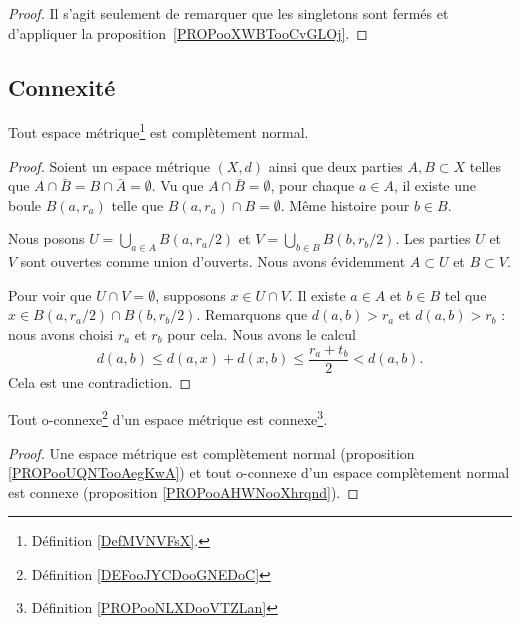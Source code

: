 \begin{proof}
	Il s'agit seulement de remarquer que les singletons sont fermés et d'appliquer la proposition~\ref{PROPooXWBTooCvGLOj}.
\end{proof}

\subsection{Connexité}


\begin{proposition}	\label{PROPooUQNTooAegKwA}
	Tout espace métrique\footnote{Définition \ref{DefMVNVFsX}.} est complètement normal.
\end{proposition}

\begin{proof}
	Soient un espace métrique \( (X,d)\) ainsi que deux parties \( A,B\subset X\) telles que \( A\cap \bar B=B\cap\bar A=\emptyset\). Vu que \( A\cap \bar B=\emptyset\), pour chaque \( a\in A\), il existe une boule \( B(a,r_a)\) telle que \( B(a,r_a)\cap B=\emptyset\). Même histoire pour \( b\in B\).

	Nous posons \( U=\bigcup_{a\in A}B(a,r_a/2)\) et \( V=\bigcup_{b\in B}B(b,r_b/2)\). Les parties \( U\) et \( V\) sont ouvertes comme union d'ouverts. Nous avons évidemment \( A\subset U\) et \( B\subset V\).

	Pour voir que \( U\cap V=\emptyset\), supposons \( x\in U\cap V\). Il existe \( a\in A\) et \( b\in B\) tel que \( x\in B(a,r_a/2)\cap B(b,r_b/2)\). Remarquons que \( d(a,b)>r_a\) et \( d(a,b)>r_b\) : nous avons choisi \( r_a\) et \( r_b\) pour cela. Nous avons le calcul
	\begin{equation}
		d(a,b)  \leq d(a,x)+d(x,b)
		\leq \frac{ r_a+t_b }{2}
		<d(a,b).
	\end{equation}
	Cela est une contradiction.
\end{proof}

\begin{proposition}	\label{PROPooBMFBooIQJMNC}
	Tout o-connexe\footnote{Définition \ref{DEFooJYCDooGNEDoC}} d'un espace métrique est connexe\footnote{Définition \ref{PROPooNLXDooVTZLan}}.
\end{proposition}

\begin{proof}
	Une espace métrique est complètement normal (proposition \ref{PROPooUQNTooAegKwA}) et tout o-connexe d'un espace complètement normal est connexe (proposition \ref{PROPooAHWNooXhrqnd}).
\end{proof}

